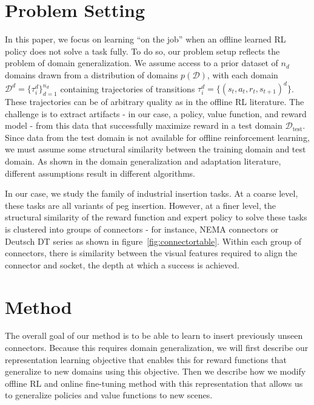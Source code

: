 


\section{Problem Setting}

In this paper, we focus on learning ``on the job'' when an offline learned RL policy does not solve a task fully.
To do so, our problem setup reflects the problem of domain generalization.
We assume access to a prior dataset of $n_d$ domains drawn from a distribution of domains $p(\mathcal{D})$, with each domain $\mathcal{D}^d = \{\tau_i^d\}_{d=1}^{n_d}$ containing trajectories of transitions $\tau_i^d = \{(s_t, a_t, r_t, s_{t+1})^d\}$.
These trajectories can be of arbitrary quality as in the offline RL literature.
The challenge is to extract artifacts - in our case, a policy, value function, and reward model - from this data that successfully maximize reward in a test domain $\mathcal{D}_\text{test}$.
Since data from the test domain is not available for offline reinforcement learning, we must assume some structural similarity between the training domain and test domain.
As shown in the domain generalization and adaptation literature, different assumptions result in different algorithms.

In our case, we study the family of industrial insertion tasks.
At a coarse level, these tasks are all variants of peg insertion.
However, at a finer level, the structural similarity of the reward function and expert policy to solve these tasks is clustered into groups of connectors - for instance, NEMA connectors or Deutsch DT series as shown in figure~\ref{fig:connectortable}.
Within each group of connectors, there is similarity between the visual features required to align the connector and socket, the depth at which a success is achieved.


\section{Method}

The overall goal of our method is to be able to learn to insert previously unseen connectors. Because this requires domain generalization, we will first describe our representation learning objective that enables this for reward functions that generalize to new domains using this objective. Then we describe how we modify offline RL and online fine-tuning method with this representation that allows us to generalize policies and value functions to new scenes.

